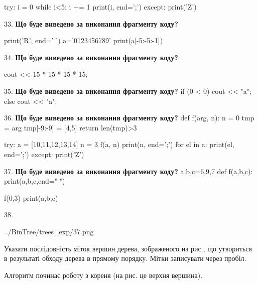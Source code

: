 \documentclass[11pt]{article}
\begin{document}
try:
    i = 0
    while i<5:
        i += 1
    print(i, end=';')
except:
    print('Z')

\par\vspace{5mm}

33. \textbf{Що буде виведено за виконання фрагменту коду?}

print('R', end=' ')
a='0123456789'
print(a[-5:-5:-1])

\par\vspace{5mm}

34. \textbf{Що буде виведено за виконання фрагменту коду?}

cout << 15 * 15 * 15 * 15;
\par\vspace{5mm}

35. \textbf{Що буде виведено за виконання фрагменту коду?}
if (0 < 0)
    cout << "a";
else
    cout << "a";

\par\vspace{5mm}

36. \textbf{Що буде виведено за виконання фрагменту коду?}
def f(arg, n):
    n = 0
    tmp = arg
    tmp[-9:-9] = [4,5]
    return len(tmp)>3

try:
    a = [10,11,12,13,14]
    n = 3
    f(a, n)
    print(n, end=';')
    for el in a:
        print(el, end=';')
except:
    print('Z')
\par\vspace{5mm}

37. \textbf{Що буде виведено за виконання фрагменту коду?}
a,b,c=6,9,7
def f(a,b,c):
    print(a,b,c,end=" ")

f(0,3)
print(a,b,c)
\par\vspace{5mm}

38. 

\begin{center}
	{../BinTree/trees_exp/37.png}
\end{center}
Указати послідовність міток вершин дерева, зображеного на рис., що утвориться в результаті обходу дерева в прямому порядку. Мітки записувати через пробіл.\par Алгоритм починає роботу з кореня (на рис. це верхня вершина).
\par\vspace{5mm}
\end{document}
